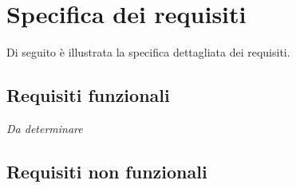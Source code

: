
\section{Specifica dei requisiti}

Di seguito \`e illustrata la specifica dettagliata dei requisiti.

\subsection{Requisiti funzionali}

\emph{Da determinare}

\subsection{Requisiti non funzionali}

